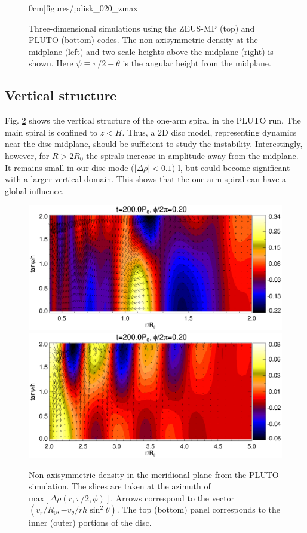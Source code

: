 \begin{figure}
\begin{center}
{      0cm]{figures/pdisk_020_zmax}
    }
  \end{center}
  \caption{Three-dimensional simulations using the ZEUS-MP (top) and 
    PLUTO (bottom) codes. The non-axisymmetric density at the midplane (left) and
    two scale-heights above the midplane (right) is shown. Here $\psi
    \equiv \pi/2 - \theta$ is the angular height  
    from the midplane.\label{3d_prelim}}   
\end{figure}

\subsection{Vertical structure}
Fig. \ref{3d_rz} shows the vertical structure of the one-arm
spiral in the PLUTO run. The main spiral is confined to $z < H$. Thus,
a 2D disc model, representing dynamics near the disc midplane, 
should be sufficient to study the instability. Interestingly, however, for $R>2R_0$ the
spirals  increase in amplitude away from the midplane. It remains
small  in our disc mode ($|\Delta\rho| < 0.1$) l, but could become 
significant with a larger vertical domain. This shows that 
the one-arm spiral can have a global influence. 

\begin{figure}
  \includegraphics[scale=0.47,clip=true,trim=0cm 0.79cm 0cm 0cm]{figures/pdisk_rz_020_sg.ps}
  \includegraphics[scale=0.47,clip=true,trim=0cm 0cm 0cm 0.64cm]{figures/pdisk_rz_020_nsg.ps}
  \caption{Non-axisymmetric density in the meridional plane from the
    PLUTO simulation. The slices are taken at the azimuth of   
    $\mathrm{max}[\Delta\rho(r,\pi/2,\phi)]$. Arrows correspond to the vector 
    $(v_r/R_0,-v_\theta/rh\sin^2{\theta})$. The top (bottom) panel corresponds
    to the inner (outer) portions of the disc. 
    \label{3d_rz}} 
\end{figure}   

